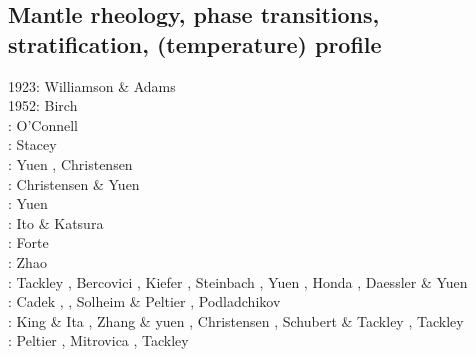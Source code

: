 \subsection{Mantle rheology, phase transitions, stratification, (temperature) profile}

\begin{scriptsize}
1923: Williamson \& Adams \cite{wiad23}\\
1952: Birch \cite{birc52}\\
\nineteenseventysix: O'Connell \cite{ocon76}\\
\nineteenseventyseven: Stacey \cite{stac77}\\
\nineteeneightytwo: Yuen \etal \cite{yusb82}, Christensen \cite{chri82}\\
\nineteeneightyfive: Christensen \& Yuen \cite{chyu85}\\
\nineteeneightysix: Yuen \cite{yuen86} \\
\nineteeneightynine: Ito \& Katsura \cite{itka89} \\
\nineteenninetyone: Forte \etal \cite{fopd91} \\
\nineteenninetytwo: Zhao \etal \cite{zhyh92}\\
\nineteenninetythree: Tackley \etal \cite{tasg93}, Bercovici \etal \cite{best93}, 
                      Kiefer \cite{kief93}, Steinbach \etal \cite{styz93},
                      Yuen \etal \cite{yucc93}, Honda \etal \cite{hoby93}, 
                      Daessler \& Yuen \cite{dayu93} \\
\nineteenninetyfour: Cadek \etal \cite{cays94}, \cite{vayv94}
                    \cite{zhgu94b}\cite{styu94}, Solheim \& Peltier \cite{sope94},
                    Podladchikov \etal \cite{popy94}\\
\nineteenninetyfive: King \& Ita \cite{kiit95}, Zhang \& yuen \cite{zhyu95}, 
                     Christensen \cite{chri95}, Schubert \& Tackley \cite{scta95},
                     Tackley \cite{tack95}\\
\nineteenninetysix: Peltier \cite{pelt96}, Mitrovica \cite{mitr96}, Tackley \cite{tack96b}\\

\end{scriptsize}
